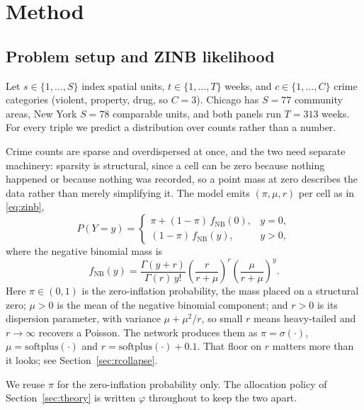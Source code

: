 \documentclass[journal,10pt,twocolumn]{IEEEtran}
\begin{document}
\section{Method}
\subsection{Problem setup and ZINB likelihood}
Let $s \in \{1,\dots,S\}$ index spatial units, $t \in \{1,\dots,T\}$ weeks, and
$c \in \{1,\dots,C\}$ crime categories (violent, property, drug, so $C = 3$).
Chicago has $S = 77$ community areas, New York $S = 78$ comparable units, and
both panels run $T = 313$ weeks. For every triple we predict a distribution over
counts rather than a number.

Crime counts are sparse and overdispersed at once, and the two need separate
machinery: sparsity is structural, since a cell can be zero because nothing
happened or because nothing was recorded, so a point mass at zero describes the
data rather than merely simplifying it. The model emits $(\pi,\mu,r)$ per cell
as in \eqref{eq:zinb},
\begin{equation}
\label{eq:zinb}
P(Y = y) =
\begin{cases}
\pi + (1-\pi)\, f_{\mathrm{NB}}(0), & y = 0,\\[2pt]
(1-\pi)\, f_{\mathrm{NB}}(y),       & y > 0,
\end{cases}
\end{equation}
where the negative binomial mass is
\begin{equation}
\label{eq:nb}
f_{\mathrm{NB}}(y) = \frac{\Gamma(y+r)}{\Gamma(r)\,y!}
  \left(\frac{r}{r+\mu}\right)^{\!r}
  \left(\frac{\mu}{r+\mu}\right)^{\!y}.
\end{equation}
Here $\pi \in (0,1)$ is the zero-inflation probability, the mass placed on a
structural zero; $\mu > 0$ is the mean of the negative binomial component; and
$r > 0$ is its dispersion parameter, with variance $\mu + \mu^2/r$, so small $r$
means heavy-tailed and $r \to \infty$ recovers a Poisson. The network produces
them as $\pi = \sigma(\cdot)$, $\mu = \mathrm{softplus}(\cdot)$ and
$r = \mathrm{softplus}(\cdot) + 0.1$. That floor on $r$ matters more than it
looks; see Section~\ref{sec:rcollapse}.

We reuse $\pi$ for the zero-inflation probability only. The allocation policy of
Section~\ref{sec:theory} is written $\varphi$ throughout to keep the two apart.
\end{document}
